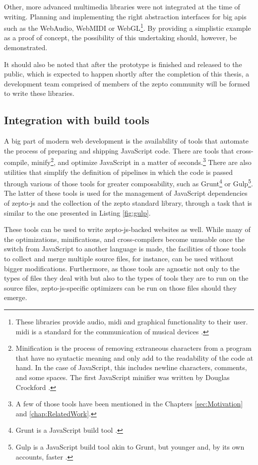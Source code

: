 \documentclass[oneside,11pt,xetex]{scrbook}
\begin{document}
Other, more advanced multimedia libraries were not integrated at the time of writing.
Planning and implementing the right abstraction interfaces for big \glspl{api} such as
the WebAudio, WebMIDI or WebGL\footnote{These libraries provide audio, \gls{midi} and
graphical functionality to their user. \gls{midi} is a standard for the communication
of musical devices \parencite{MIDI}.}. By providing a simplistic example as a proof
of concept, the possibility of this undertaking should, however, be demonstrated.

It should also be noted that after the prototype is finished and released to the
public, which is expected to happen shortly after the completion of this thesis,
a development team comprised of members of the zepto community will be formed
to write these libraries.

\subsection{Integration with build tools}
\label{sec:IntegrationTooling}

A big part of modern web development is the availability of tools that automate
the process of preparing and shipping JavaScript code. There are tools that
cross-compile, minify\footnote{Minification is the process of removing extraneous
characters from a program that have no syntactic meaning and only add to the readability
of the code at hand. In the case of JavaScript, this includes newline characters,
comments, and some spaces. The first JavaScript minifier was written by Douglas
Crockford \parencite{JSMIN}.}, and optimize JavaScript in a matter of
seconds.\footnote{A few of those tools have been mentioned in the Chapters
\ref{sec:Motivation} and \ref{chap:RelatedWork}.} There are also utilities that
simplify the definition of pipelines in which the code is passed through various
of those tools for greater composability, such as Grunt\footnote{Grunt is a JavaScript
build tool \parencite{GRUNT}.} or Gulp\footnote{Gulp is a JavaScript build
tool akin to Grunt, but younger and, by its own accounts, faster \parencite{GULP}.}.
The latter of these tools is used for the management of JavaScript dependencies of
zepto-js and the collection of the zepto standard library, through a task that is
similar to the one presented in Listing \ref{fig:gulp}.

These tools can be used to write zepto-js-backed websites as well. While many of
the optimizations, minifications, and cross-compilers become unusable once the switch
from JavaScript to another language is made, the facilities of those tools to collect
and merge multiple source files, for instance, can be used without bigger modifications.
Furthermore, as those tools are agnostic not only to the types of files they deal with
but also to the types of tools they are to run on the source files, zepto-js-specific
optimizers can be run on those files should they emerge.
\end{document}
